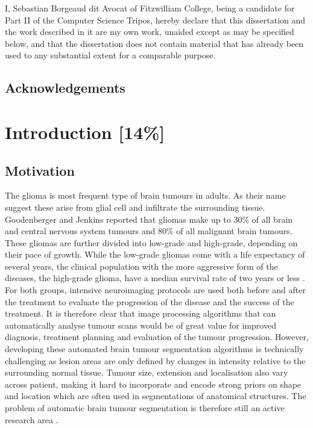 \documentclass[12pt,a4paper,twoside,openright]{report}
\begin{document}
I, Sebastian Borgeaud dit Avocat of Fitzwilliam College, being a candidate for Part II of the Computer Science Tripos, hereby declare
that this dissertation and the work described in it are my own work,
unaided except as may be specified below, and that the dissertation
does not contain material that has already been used to any substantial
extent for a comparable purpose.

\bigskip
{}

\medskip
{}

\tableofcontents

\listoffigures

\newpage

\setlength{\parskip}{1em} %

\section*{Acknowledgements}



\pagestyle{headings}

\chapter{Introduction [14\%]}
\section{Motivation}
The glioma is most frequent type of brain tumours in adults. As their name suggest these arise from glial cell and infiltrate the surrounding tissue. Goodenberger and Jenkins \cite{gliomas_research} reported that gliomas make up to 30\% of all brain and central nervous system tumours and 80\% of all malignant brain tumours. These gliomas are further divided into low-grade and high-grade, depending on their pace of growth. While the low-grade gliomas come with a life expectancy of several years, the clinical population with the more aggressive form of the diseases, the high-grade glioma, have a median survival rate of two years or less \cite{gliomas_life_expectancy}. For both groups, intensive neuroimaging protocols are used both before and after the treatment to evaluate the progression of the disease and the success of the treatment. It is therefore clear that image processing algorithms that can automatically analyse tumour scans would be of great value for improved diagnosis, treatment planning and evaluation of the tumour progression. However, developing these automated brain tumour segmentation algorithms is technically challenging as lesion areas are only defined by changes in intensity relative to the surrounding normal tissue. Tumour size, extension and localisation also vary across patient, making it hard to incorporate and encode strong priors on shape and location which are often used in segmentations of anatomical structures. The problem of automatic brain tumour segmentation is therefore still an active research area \cite{brats-proceedings}.
\end{document}
